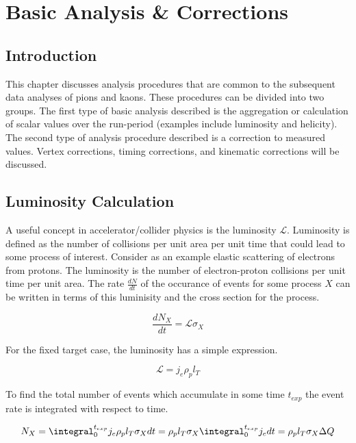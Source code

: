 \chapter{Basic Analysis \& Corrections}

\section{Introduction}
This chapter discusses analysis procedures that are common to the subsequent data analyses of pions and kaons.  These procedures can be divided into two groups.  The first type of basic analysis described is the aggregation or calculation of scalar values over the run-period (examples include luminosity and helicity).  The second type of analysis procedure described is a correction to measured values.  Vertex corrections, timing corrections, and kinematic corrections will be discussed.


\section{Luminosity Calculation}
A useful concept in accelerator/collider physics is the luminosity $\mathcal{L}$.  Luminosity is defined as the number of collisions per unit area per unit time that could lead to some process of interest.  Consider as an example elastic scattering of electrons from protons.  The luminosity is the number of electron-proton collisions per unit time per unit area.  The rate $\frac{dN}{dt}$ of the occurance of events for some process $X$ can be written in terms of this luminisity and the cross section for the process.

\begin{equation}
	\frac{dN_X}{dt} = \mathcal{L} \sigma_X 
\end{equation}

For the fixed target case, the luminosity has a simple expression.

\begin{equation}
	\mathcal{L} = j_e \rho_p l_T 
\end{equation}

To find the total number of events which accumulate in some time $t_{exp}$ the event rate is integrated with respect to time.

\begin{equation}
	N_X = \integral_{0}^{t_{exp}} j_e \rho_p l_T \sigma_X dt = \rho_p l_T \sigma_X \integral_{0}^{t_{exp}} j_e dt =  \rho_p l_T \sigma_X \Delta Q
\end{equation}

